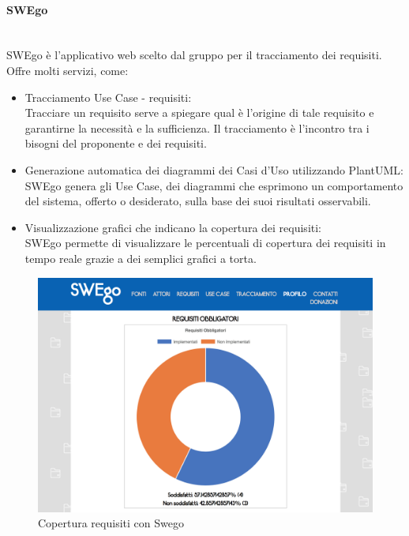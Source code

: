 		\paragraph{SWEgo}
		\label {sec:SWEgo}
		\mbox{}\\
		SWEgo è l'applicativo web scelto dal gruppo per il tracciamento dei requisiti. Offre molti servizi, come:
		\begin{itemize}
			\item Tracciamento Use Case - requisiti:\\
			Tracciare un requisito serve a spiegare qual è l'origine di tale requisito e garantirne la necessità e la sufficienza. Il tracciamento è l'incontro tra i bisogni del proponente e dei requisiti.
			\item Generazione automatica dei diagrammi dei Casi d'Uso utilizzando PlantUML:\\
			SWEgo genera gli Use Case, dei diagrammi che esprimono un comportamento del sistema, offerto o desiderato, sulla base dei suoi risultati osservabili.
			\item Visualizzazione grafici che indicano la copertura dei requisiti: \\
			SWEgo permette di visualizzare le percentuali di copertura dei requisiti in tempo reale grazie a dei semplici grafici a torta.
		\end{itemize}
		\begin{figure}[h]
		\label{figuraSwego}
		\centering 
		\includegraphics[width=1\textwidth]{images/swego1.png}
		\caption{Copertura requisiti con Swego} %
		\end{figure}
	
